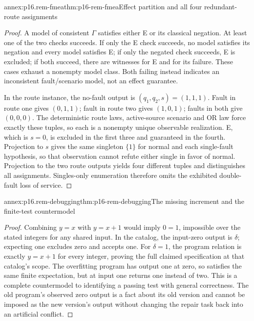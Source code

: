 \begin{annexitem}{annex:p16.rem-fmea}{thm:p16-rem-fmea}{Effect partition and all four redundant-route assignments}
\begin{proof}
A model of consistent \(\Gamma\) satisfies either E or its classical
negation. At least one of the two checks succeeds. If only the E check
succeeds, no model satisfies its negation and every model satisfies E;
if only the negated check succeeds, E is excluded; if both succeed,
there are witnesses for E and for its failure. These cases exhaust a
nonempty model class. Both failing instead indicates an inconsistent
fault/scenario model, not an effect guarantee.

In the route instance, the no-fault output is \((q_1,q_2,s)=(1,1,1)\).
Fault in route one gives \((0,1,1)\); fault in route two gives
\((1,0,1)\); faults in both give \((0,0,0)\). The deterministic
route laws, active-source scenario and OR law force exactly these tuples,
so each is a nonempty unique observable realization. E, which is \(s=0\),
is excluded in the first three and guaranteed in the fourth. Projection
to \(s\) gives the same singleton \(\{1\}\) for normal and each
single-fault hypothesis, so that observation cannot refute either single
in favor of normal. Projection to the two route outputs yields four
different tuples and distinguishes all assignments. Singles-only
enumeration therefore omits the exhibited double-fault loss of service.
\end{proof}
\end{annexitem}

\begin{annexitem}{annex:p16.rem-debugging}{thm:p16-rem-debugging}{The missing increment and the finite-test countermodel}
\begin{proof}
Combining \(y=x\) with \(y=x+1\) would imply \(0=1\), impossible
over the stated integers for any shared input. In the catalog, the
input-zero output is \(\delta\); expecting one excludes zero and
accepts one. For \(\delta=1\), the program relation is exactly
\(y=x+1\) for every integer, proving the full claimed specification
at that catalog's scope. The overfitting program has output one at zero,
so satisfies the same finite expectation, but at input one returns one
instead of two. This is a complete countermodel to identifying a passing
test with general correctness. The old program's observed zero output
is a fact about its old version and cannot be imposed as the new version's
output without changing the repair task back into an artificial conflict.
\end{proof}
\end{annexitem}
